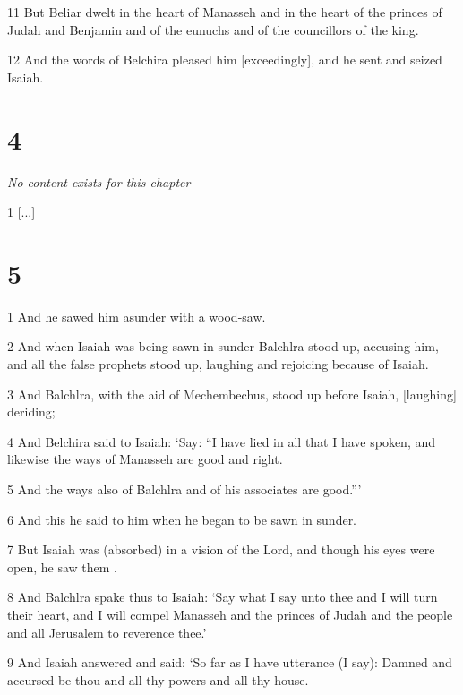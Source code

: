 \par 11 But Beliar dwelt in the heart of Manasseh and in the heart of the princes of Judah and Benjamin and of the eunuchs and of the councillors of the king.

\par 12 And the words of Belchira pleased him [exceedingly], and he sent and seized Isaiah.

\chapter{4}

\par \textit{No content exists for this chapter}

\par 1 [...]

\chapter{5}

\par 1 And he sawed him asunder with a wood-saw.

\par 2 And when Isaiah was being sawn in sunder Balchlra stood up, accusing him, and all the false prophets stood up, laughing and rejoicing because of Isaiah.

\par 3 And Balchlra, with the aid of Mechembechus, stood up before Isaiah, [laughing] deriding;

\par 4 And Belchira said to Isaiah: ‘Say: “I have lied in all that I have spoken, and likewise the ways of Manasseh are good and right.

\par 5 And the ways also of Balchlra and of his associates are good.”’

\par 6 And this he said to him when he began to be sawn in sunder.

\par 7 But Isaiah was (absorbed) in a vision of the Lord, and though his eyes were open, he saw them .

\par 8 And Balchlra spake thus to Isaiah: ‘Say what I say unto thee and I will turn their heart, and I will compel Manasseh and the princes of Judah and the people and all Jerusalem to reverence thee.’

\par 9 And Isaiah answered and said: ‘So far as I have utterance (I say): Damned and accursed be thou and all thy powers and all thy house.

